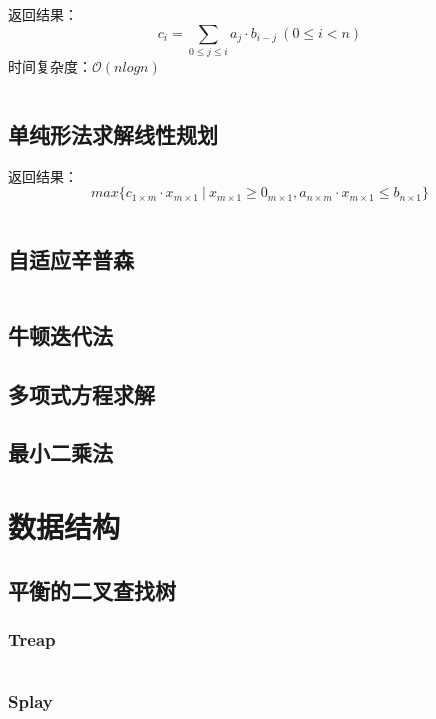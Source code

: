 \documentclass[a4paper]{article}
\newcommand{\cppcode}[1]{
    \inputminted[mathescape]{cpp}{source/#1}
}
\begin{document}
返回结果：$$c_i=\sum_{0 \leq j \leq i} a_j \cdot b_{i-j} \ (0 \leq i < n)$$
\indent 时间复杂度：$\mathcal{O}(n log n)$

\cppcode{numerical-algorithm/fast-fourier-transform.cpp}

\subsection{单纯形法求解线性规划}

返回结果：$$max\{c_{1 \times m} \cdot x_{m \times 1} \ | \ x_{m \times 1} \geq 0_{m \times 1}, a_{n \times m} \cdot x_{m \times 1} \leq b_{n \times 1}\}$$

\cppcode{numerical-algorithm/linear-programming-simplex.cpp}

\subsection{自适应辛普森}

\cppcode{numerical-algorithm/adaptive-simpson.cpp}

\subsection{牛顿迭代法}

\subsection{多项式方程求解}

\subsection{最小二乘法}

\section{数据结构}

\subsection{平衡的二叉查找树}

\subsubsection{Treap}

\cppcode{data-structure/treap.cpp}

\subsubsection{Splay}
\end{document}
